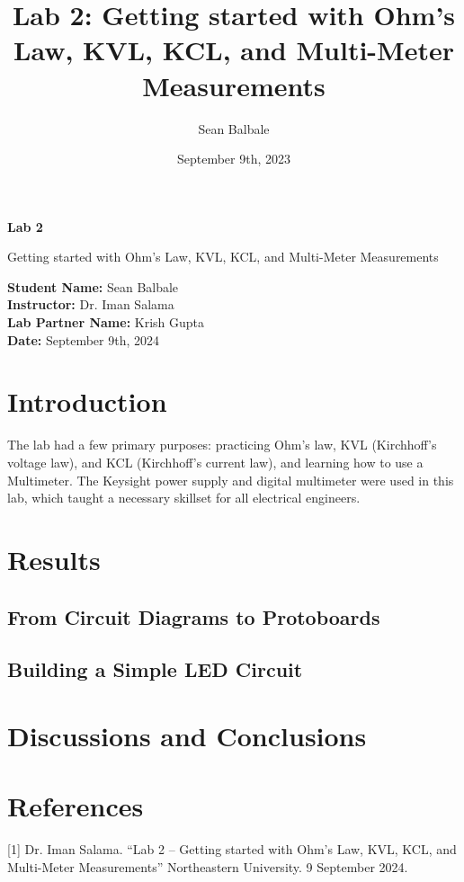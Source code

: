 \documentclass{article}
\title{Lab 2: Getting started with Ohm's Law, KVL, KCL, and Multi-Meter
Measurements}
\author{Sean Balbale}
\date{September 9th, 2023}
\begin{document}
\begin{titlepage}
    \begin{center}
        \vspace*{1in}
            
        \Huge
        \textbf{Lab 2}
            
        \LARGE
        Getting started with Ohm’s Law, KVL, KCL, and Multi-Meter Measurements
            
        \vspace{3 in}
            
        \textbf{Student Name:} Sean Balbale
        \\ \textbf{Instructor:} Dr. Iman Salama
        \\ \textbf{Lab Partner Name:} Krish Gupta
        \\ \textbf{Date:} September 9th, 2024

        \vfill
            
            
    \end{center}
\end{titlepage}

\newpage 


\section{Introduction}
The lab had a few primary purposes: practicing Ohm’s law, 
KVL (Kirchhoff's voltage law), and KCL (Kirchhoff's current law), 
and learning how to use a Multimeter. The Keysight power supply 
and digital multimeter were used in this lab, which taught a 
necessary skillset for all electrical engineers.

\section{Results}

\subsection{From Circuit Diagrams to Protoboards}



\subsection{Building a Simple LED Circuit}


\section{Discussions and Conclusions}


\section{References}
[1] Dr. Iman Salama. “Lab 2 – Getting started with Ohm’s Law, KVL, KCL, 
and Multi-Meter Measurements” Northeastern University. 9 September 2024.
\end{document}
